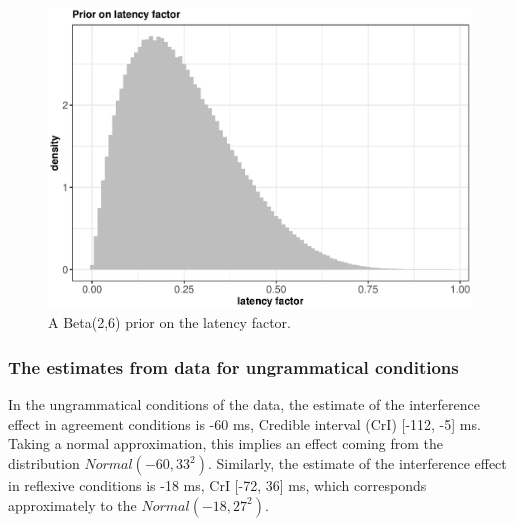 \documentclass{cambridge7A}\usepackage[]{graphicx}\usepackage[]{color}
\makeatletter
\def\maxwidth{ %
  \ifdim\Gin@nat@width>\linewidth
    \linewidth
  \else
    \Gin@nat@width
  \fi
}
\newenvironment{knitrout}{}{} %
\makeatother
\begin{document}
\begin{figure}[!htbp]
\centering
\begin{knitrout}
\color{fgcolor}

{\centering \includegraphics[width=\maxwidth]{figures/fig-betaprior-1} 

}



\end{knitrout}
\caption{A Beta(2,6) prior on the latency factor.}\label{fig:betaprior}
\end{figure}


\subsubsection{The estimates from data for ungrammatical conditions}

In the ungrammatical conditions of the \cite{DillonMishlerSloggett2013} data, the estimate of the interference effect in agreement conditions is -60 ms, Credible interval (CrI) [-112, -5] ms. Taking a normal approximation, this implies an effect coming from the distribution $Normal(-60,33^2)$.
Similarly, the estimate of the interference effect in reflexive conditions is -18 ms, CrI [-72, 36] ms, which corresponds approximately to the $Normal(-18,27^2)$.
\end{document}
